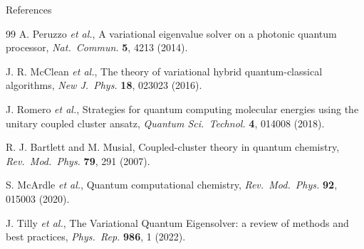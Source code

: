 \documentclass[10pt,aspectratio=169]{beamer}
\begin{document}
\begin{frame}{References}
\footnotesize
\begin{thebibliography}{99}
A. Peruzzo \emph{et al.},
A variational eigenvalue solver on a photonic quantum processor,
\emph{Nat.\ Commun.} \textbf{5}, 4213 (2014).

J. R. McClean \emph{et al.},
The theory of variational hybrid quantum-classical algorithms,
\emph{New J.\ Phys.} \textbf{18}, 023023 (2016).

J. Romero \emph{et al.},
Strategies for quantum computing molecular energies using the unitary coupled cluster ansatz,
\emph{Quantum Sci.\ Technol.} \textbf{4}, 014008 (2018).

R. J. Bartlett and M. Musial,
Coupled-cluster theory in quantum chemistry,
\emph{Rev.\ Mod.\ Phys.} \textbf{79}, 291 (2007).

S. McArdle \emph{et al.},
Quantum computational chemistry,
\emph{Rev.\ Mod.\ Phys.} \textbf{92}, 015003 (2020).

J. Tilly \emph{et al.},
The Variational Quantum Eigensolver: a review of methods and best practices,
\emph{Phys.\ Rep.} \textbf{986}, 1 (2022).
\end{thebibliography}
\end{frame}
\end{document}
